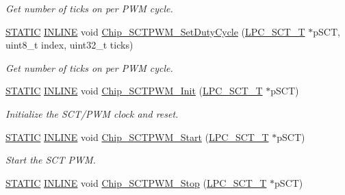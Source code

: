 \begin{DoxyCompactItemize}
\begin{DoxyCompactList}\small\item\em Get number of ticks on per P\+WM cycle. \end{DoxyCompactList}\item 
\hyperlink{group___l_p_c___types___public___macros_ga10b2d890d871e1489bb02b7e70d9bdfb}{S\+T\+A\+T\+IC} \hyperlink{spifi__18xx__43xx_8h_a2eb6f9e0395b47b8d5e3eeae4fe0c116}{I\+N\+L\+I\+NE} void \hyperlink{group___s_c_t___p_w_m__18_x_x__43_x_x_ga3e77a40e96ba3352a341054f6d1c506c}{Chip\+\_\+\+S\+C\+T\+P\+W\+M\+\_\+\+Set\+Duty\+Cycle} (\hyperlink{struct_l_p_c___s_c_t___t}{L\+P\+C\+\_\+\+S\+C\+T\+\_\+T} $\ast$p\+S\+CT, uint8\+\_\+t index, uint32\+\_\+t ticks)
\begin{DoxyCompactList}\small\item\em Get number of ticks on per P\+WM cycle. \end{DoxyCompactList}\item 
\hyperlink{group___l_p_c___types___public___macros_ga10b2d890d871e1489bb02b7e70d9bdfb}{S\+T\+A\+T\+IC} \hyperlink{spifi__18xx__43xx_8h_a2eb6f9e0395b47b8d5e3eeae4fe0c116}{I\+N\+L\+I\+NE} void \hyperlink{group___s_c_t___p_w_m__18_x_x__43_x_x_gab977afb29a407437f574b822fa71af62}{Chip\+\_\+\+S\+C\+T\+P\+W\+M\+\_\+\+Init} (\hyperlink{struct_l_p_c___s_c_t___t}{L\+P\+C\+\_\+\+S\+C\+T\+\_\+T} $\ast$p\+S\+CT)
\begin{DoxyCompactList}\small\item\em Initialize the S\+C\+T/\+P\+WM clock and reset. \end{DoxyCompactList}\item 
\hyperlink{group___l_p_c___types___public___macros_ga10b2d890d871e1489bb02b7e70d9bdfb}{S\+T\+A\+T\+IC} \hyperlink{spifi__18xx__43xx_8h_a2eb6f9e0395b47b8d5e3eeae4fe0c116}{I\+N\+L\+I\+NE} void \hyperlink{group___s_c_t___p_w_m__18_x_x__43_x_x_ga732ad07a287df19b9e0f13b7402476d4}{Chip\+\_\+\+S\+C\+T\+P\+W\+M\+\_\+\+Start} (\hyperlink{struct_l_p_c___s_c_t___t}{L\+P\+C\+\_\+\+S\+C\+T\+\_\+T} $\ast$p\+S\+CT)
\begin{DoxyCompactList}\small\item\em Start the S\+CT P\+WM. \end{DoxyCompactList}\item 
\hyperlink{group___l_p_c___types___public___macros_ga10b2d890d871e1489bb02b7e70d9bdfb}{S\+T\+A\+T\+IC} \hyperlink{spifi__18xx__43xx_8h_a2eb6f9e0395b47b8d5e3eeae4fe0c116}{I\+N\+L\+I\+NE} void \hyperlink{group___s_c_t___p_w_m__18_x_x__43_x_x_ga3f0637126d5ea4efa32dfdc9043b79d9}{Chip\+\_\+\+S\+C\+T\+P\+W\+M\+\_\+\+Stop} (\hyperlink{struct_l_p_c___s_c_t___t}{L\+P\+C\+\_\+\+S\+C\+T\+\_\+T} $\ast$p\+S\+CT)

\end{DoxyCompactItemize}
